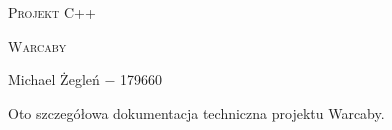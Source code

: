 \documentclass[fleqn,onecolumn,a4paper,12pt,titlepage]{article}
\begin{document}
\begin{titlepage}
    \centering
    {\LARGE \textsc{Projekt C++} \par}
    \vspace{2cm}
    {\Large \textsc{Warcaby} \par} %
    \vspace{2cm}
    \vfill
    Michael Żegleń $-$ 179660 \par %
\end{titlepage}

\newpage

Oto szczegółowa dokumentacja techniczna projektu Warcaby.
\end{document}
